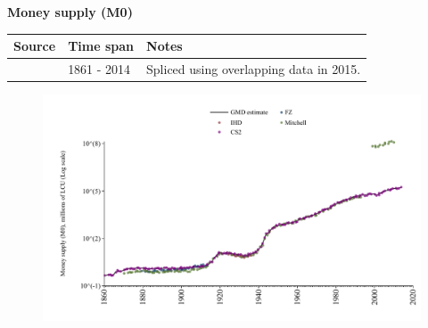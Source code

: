 \documentclass[12pt,a4paper,landscape]{article}
\begin{document}
\begin{adjustbox}{max totalsize={\paperwidth}{\paperheight},center}
\begin{minipage}[t][\textheight][t]{\textwidth}
\vspace*{0.5cm}
{}
\begin{center}
{\Large\bfseries Money supply (M0)}
\end{center}
\vspace{0.5cm}
\begin{table}[H]
\centering
\small
\begin{tabular}{|l|l|l|}
\hline
\textbf{Source} & \textbf{Time span} & \textbf{Notes} \\
\hline
\rowcolor{white}\cite{CS2_ITA}& 1861 - 2014 &Spliced using overlapping data in 2015. \\
\hline
\end{tabular}
\end{table}
\begin{figure}[H]
\centering
\includegraphics[width=\textwidth,height=0.6\textheight,keepaspectratio]{graphs/ITA_M0.pdf}
\end{figure}
\end{minipage}
\end{adjustbox}
\end{document}
